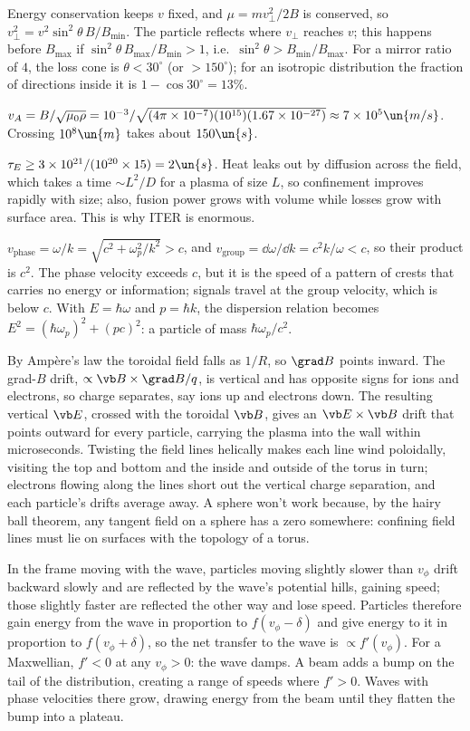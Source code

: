  Energy conservation keeps $v$ fixed, and $\mu = mv_\perp^2/2B$ is conserved, so $v_\perp^2 = v^2\sin^2\theta\,B/B_{\min}$. The particle reflects where $v_\perp$ reaches $v$; this happens before $B_{\max}$ if $\sin^2\theta\,B_{\max}/B_{\min}>1$, i.e.\ $\sin^2\theta>B_{\min}/B_{\max}$. For a mirror ratio of $4$, the loss cone is $\theta<30^\circ$ (or $>150^\circ$); for an isotropic distribution the fraction of directions inside it is $1-\cos30^\circ = 13\%$.

 $v_A = B/\sqrt{\mu_0\rho} = 10^{-3}/\sqrt{(4\pi\times10^{-7})(10^{15})(1.67\times10^{-27})}\approx7\times10^5\un{m/s}$. Crossing $10^8\un{m}$ takes about $150\un{s}$.

 $\tau_E\ge3\times10^{21}/(10^{20}\times15) = 2\un{s}$. Heat leaks out by diffusion across the field, which takes a time $\sim L^2/D$ for a plasma of size $L$, so confinement improves rapidly with size; also, fusion power grows with volume while losses grow with surface area. This is why ITER is enormous.

 $v_{\text{phase}} = \omega/k = \sqrt{c^2 + \omega_p^2/k^2}>c$, and $v_{\text{group}} = \dd\omega/\dd k = c^2k/\omega<c$, so their product is $c^2$. The phase velocity exceeds $c$, but it is the speed of a pattern of crests that carries no energy or information; signals travel at the group velocity, which is below $c$. With $E = \hbar\omega$ and $p = \hbar k$, the dispersion relation becomes $E^2 = (\hbar\omega_p)^2 + (pc)^2$: a particle of mass $\hbar\omega_p/c^2$.

 By Amp\`ere's law the toroidal field falls as $1/R$, so $\grad B$ points inward. The grad-$B$ drift, $\propto\vb B\times\grad B/q$, is vertical and has opposite signs for ions and electrons, so charge separates, say ions up and electrons down. The resulting vertical $\vb E$, crossed with the toroidal $\vb B$, gives an $\vb E\times\vb B$ drift that points outward for every particle, carrying the plasma into the wall within microseconds. Twisting the field lines helically makes each line wind poloidally, visiting the top and bottom and the inside and outside of the torus in turn; electrons flowing along the lines short out the vertical charge separation, and each particle's drifts average away. A sphere won't work because, by the hairy ball theorem, any tangent field on a sphere has a zero somewhere: confining field lines must lie on surfaces with the topology of a torus.

 In the frame moving with the wave, particles moving slightly slower than $v_\phi$ drift backward slowly and are reflected by the wave's potential hills, gaining speed; those slightly faster are reflected the other way and lose speed. Particles therefore gain energy from the wave in proportion to $f(v_\phi - \delta)$ and give energy to it in proportion to $f(v_\phi+\delta)$, so the net transfer to the wave is $\propto f'(v_\phi)$. For a Maxwellian, $f'<0$ at any $v_\phi>0$: the wave damps. A beam adds a bump on the tail of the distribution, creating a range of speeds where $f'>0$. Waves with phase velocities there grow, drawing energy from the beam until they flatten the bump into a plateau.
